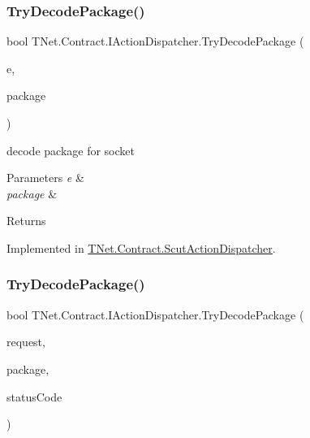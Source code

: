 \subsubsection{\texorpdfstring{Try\+Decode\+Package()}{TryDecodePackage()}\hspace{0.1cm}{\footnotesize\ttfamily [1/4]}}
{\footnotesize\ttfamily bool T\+Net.\+Contract.\+I\+Action\+Dispatcher.\+Try\+Decode\+Package (\begin{DoxyParamCaption}\item[{Connection\+Event\+Args}]{e,  }\item[{out \mbox{\hyperlink{class_t_net_1_1_contract_1_1_request_package}{Request\+Package}}}]{package }\end{DoxyParamCaption})}



decode package for socket 


\begin{DoxyParams}{Parameters}
{\em e} & \\
\hline
{\em package} & \\
\hline
\end{DoxyParams}
\begin{DoxyReturn}{Returns}

\end{DoxyReturn}


Implemented in \mbox{\hyperlink{class_t_net_1_1_contract_1_1_scut_action_dispatcher_a0e8423b7c8a7447b5b462b55d6b4fdfc}{T\+Net.\+Contract.\+Scut\+Action\+Dispatcher}}.

\mbox{\label{interface_t_net_1_1_contract_1_1_i_action_dispatcher_a689e3bea000c3e52404e890d20226617}} 
\subsubsection{\texorpdfstring{Try\+Decode\+Package()}{TryDecodePackage()}\hspace{0.1cm}{\footnotesize\ttfamily [2/4]}}
{\footnotesize\ttfamily bool T\+Net.\+Contract.\+I\+Action\+Dispatcher.\+Try\+Decode\+Package (\begin{DoxyParamCaption}\item[{Http\+Listener\+Request}]{request,  }\item[{out \mbox{\hyperlink{class_t_net_1_1_contract_1_1_request_package}{Request\+Package}}}]{package,  }\item[{out int}]{status\+Code }\end{DoxyParamCaption})}







